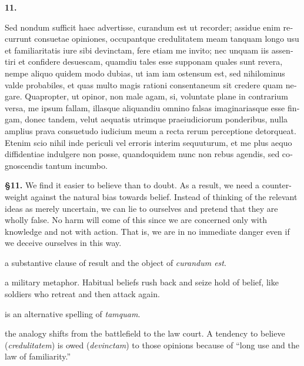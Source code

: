 
\clearpage

\beginnumbering
\pstart
\textbf{11.} \begin{latin}Sed nondum sufficit haec advertisse, curandum est ut recorder; assidue enim recurrunt consuetae opiniones, occupantque credulitatem meam tanquam longo usu et familiaritatis iure sibi devinctam, fere etiam me invito; nec unquam iis assentiri et confidere desuescam, quamdiu tales esse supponam quales sunt revera, nempe aliquo quidem modo dubias, ut iam iam ostensum est, sed nihilominus valde probabiles, et quas multo magis rationi consentaneum sit credere quam negare. Quapropter, ut opinor, non male agam, si, voluntate plane in contrarium versa, me ipsum fallam, illasque aliquandiu omnino falsas imaginariasque esse fingam, donec tandem, velut aequatis utrimque praeiudiciorum ponderibus, nulla amplius prava consuetudo iudicium meum a recta rerum perceptione detorqueat. Etenim scio nihil inde periculi vel erroris interim sequuturum, et me plus aequo diffidentiae indulgere non posse, quandoquidem nunc non rebus agendis, sed cognoscendis tantum incumbo.\end{latin}
\pend
\endnumbering

\prenotes

\textbf{§11.} We find it easier to believe than to doubt. As a result, we need a counter-weight against the natural bias towards belief. Instead of thinking of the relevant ideas as merely uncertain, we can lie to ourselves and pretend that they are wholly false. No harm will come of this since we are concerned only with knowledge and not with action. That is, we are in no immediate danger even if we deceive ourselves in this way.

 a substantive clause of result and the object of \textit{curandum est}.

 a military metaphor. Habitual beliefs rush back and seize hold of belief, like soldiers who retreat and then attack again.

 is an alternative spelling of \textit{tamquam}. 

 the analogy shifts from the battlefield to the law court. A tendency to believe (\textit{credulitatem}) is owed (\textit{devinctam}) to those opinions because of ``long use and the law of familiarity.''

